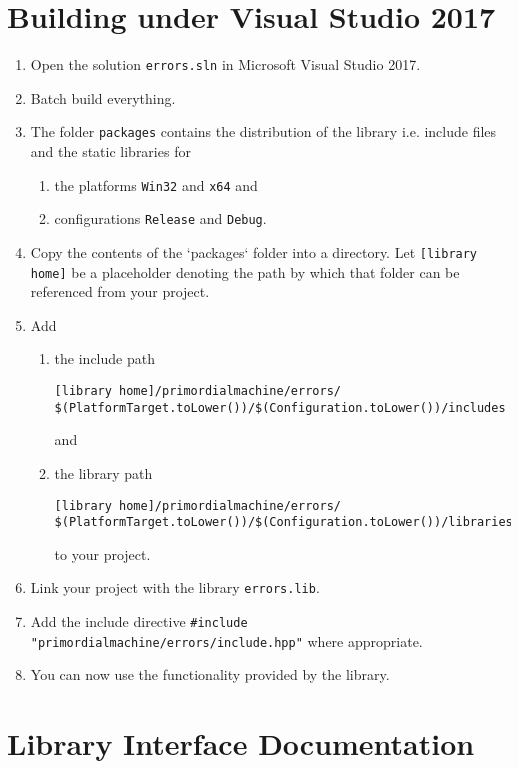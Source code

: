 \documentclass[oneside]{article}
\begin{document}
\section{Building under Visual Studio 2017}
\begin{enumerate}
\item Open the solution \texttt{errors.sln} in Microsoft Visual Studio 2017.
\item Batch build everything.
\item The folder \texttt{packages} contains the distribution of the library i.e. include files and the
      static libraries for
  \begin{enumerate}
    \item the platforms \texttt{Win32} and \texttt{x64} and
    \item configurations \texttt{Release} and \texttt{Debug}.
  \end{enumerate}
\item Copy the contents of the `packages` folder into a directory. Let
      \verb+[library home]+ be a placeholder denoting the path by which that folder
      can be referenced from your project.
\item Add
  \begin{enumerate}
    \item the include path
\begin{verbatim}
[library home]/primordialmachine/errors/
$(PlatformTarget.toLower())/$(Configuration.toLower())/includes
\end{verbatim}
	and
    \item the library path
\begin{verbatim}
[library home]/primordialmachine/errors/
$(PlatformTarget.toLower())/$(Configuration.toLower())/libraries
\end{verbatim}
    to your project.
\end{enumerate}
\item Link your project with the library \verb+errors.lib+.
\item Add the include directive \lstinline{#include "primordialmachine/errors/include.hpp"} where appropriate.
\item You can now use the functionality provided by the library.
\end{enumerate}

\section{Library Interface Documentation}
\end{document}
